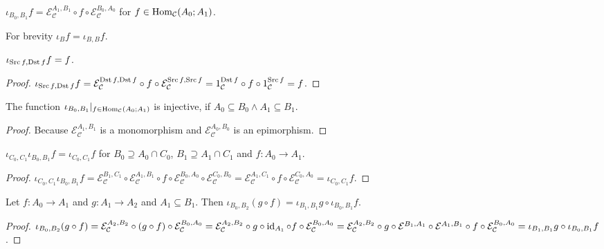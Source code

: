 \begin{defn}
  $\iota_{B_0, B_1} f = \mathcal{E}_{\mathcal{C}}^{A_1,B_1} \circ f \circ
  \mathcal{E}_{\mathcal{C}}^{B_0,A_0}$ for $f \in
  \operatorname{Hom}_{\mathcal{C}} (A_0 ; A_1)$.
\end{defn}

For brevity $\iota_B f = \iota_{B, B} f$.

\begin{prop}
  $\iota_{\operatorname{Src} f, \operatorname{Dst} f} f = f$.
\end{prop}

\begin{proof}
  $\iota_{\operatorname{Src} f, \operatorname{Dst} f} f = \mathcal{E}_\mathcal{C}^{\operatorname{Dst} f,\operatorname{Dst} f} \circ f \circ \mathcal{E}_\mathcal{C}^{\operatorname{Src} f,\operatorname{Src} f} =
  1_{\mathcal{C}}^{\operatorname{Dst} f} \circ f \circ 1_{\mathcal{C}}^{\operatorname{Src} f} = f$.
\end{proof}

\begin{prop}
  The function $\iota_{B_0, B_1} |_{f \in \operatorname{Hom}_{\mathcal{C}} (A_0 ;
  A_1)}$ is injective, if $A_0 \subseteq B_0 \wedge A_1 \subseteq B_1$.
\end{prop}

\begin{proof}
  Because $\mathcal{E}_{\mathcal{C}}^{A_1,B_1}$ is a monomorphism and $\mathcal{E}_{\mathcal{C}}^{A_0,B_0}$ is an epimorphism.
\end{proof}

\begin{prop}
  $\iota_{C_0, C_1} \iota_{B_0, B_1} f = \iota_{C_0, C_1} f$ for $B_0
  \supseteq A_0 \cap C_0$, $B_1 \supseteq A_1 \cap C_1$ and $f : A_0
  \rightarrow A_1$.
\end{prop}

\begin{proof}
  $\iota_{C_0, C_1} \iota_{B_0, B_1} f = \mathcal{E}_{\mathcal{C}}^{B_1,C_1}
  \circ \mathcal{E}_{\mathcal{C}}^{A_1,B_1} \circ f \circ \mathcal{E}_{\mathcal{C}}^{B_0,A_0} \circ
  \mathcal{E}_{\mathcal{C}}^{C_0,B_0} = \mathcal{E}_{\mathcal{C}}^{A_1,C_1} \circ f \circ \mathcal{E}_{\mathcal{C}}^{C_0,A_0} =
  \iota_{C_0,C_1} f$.
\end{proof}

\begin{prop}
  Let $f : A_0 \rightarrow A_1$ and $g : A_1 \rightarrow A_2$ and $A_1
  \subseteq B_1$. Then $\iota_{B_0, B_2} (g \circ f) = \iota_{B_1, B_1} g
  \circ \iota_{B_0, B_1} f$.
\end{prop}

\begin{proof}
  $\iota_{B_0, B_2} (g \circ f) = \mathcal{E}_{\mathcal{C}}^{A_2,B_2}
  \circ (g \circ f) \circ \mathcal{E}_{\mathcal{C}}^{B_0,A_0} = \mathcal{E}_{\mathcal{C}}^{A_2,B_2} \circ g \circ \operatorname{id}_{A_1} \circ f
  \circ \mathcal{E}_{\mathcal{C}}^{B_0,A_0} = \mathcal{E}_{\mathcal{C}}^{A_2,B_2} \circ g \circ \mathcal{E}^{B_1,A_1}
  \circ \mathcal{E}^{A_1,B_1} \circ f \circ \mathcal{E}_{\mathcal{C}}^{B_0,A_0} = \iota_{B_1, B_1} g \circ \iota_{B_0,
  B_1} f$.
\end{proof}

